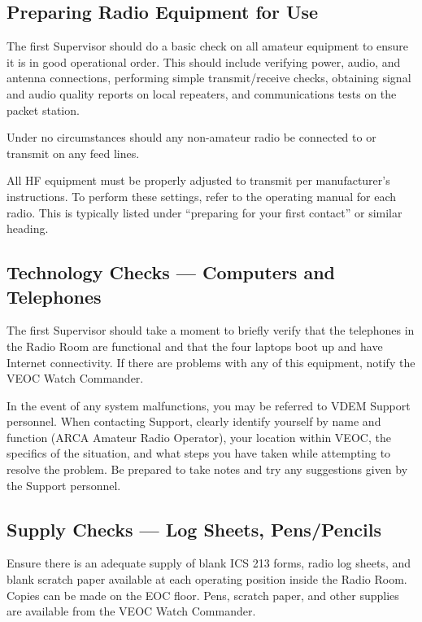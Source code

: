 \documentclass[pdflatex,letterpaper,twoside,12pt]{book}
\begin{document}
\subsection{Preparing Radio Equipment for Use}

The first Supervisor should do a basic check on all amateur equipment to ensure it is in good operational order.  This should include verifying power, audio, and antenna connections, performing simple transmit/receive checks, obtaining signal and audio quality reports on local repeaters, and communications tests on the packet station.

Under no circumstances should any non-amateur radio be connected to or transmit on any feed lines.

All HF equipment must be properly adjusted to transmit per manufacturer's instructions.  To perform these settings, refer to the operating manual for each radio.  This is typically listed under ``preparing for your first contact'' or similar heading.

\subsection{Technology Checks --- Computers and Telephones}

The first Supervisor should take a moment to briefly verify that the telephones in the Radio Room are functional and that the four laptops boot up and have Internet connectivity.  If there are problems with any of this equipment, notify the VEOC Watch Commander.

In the event of any system malfunctions, you may be referred to VDEM Support personnel.  When contacting Support, clearly identify yourself by name and function (ARCA Amateur Radio Operator), your location within VEOC, the specifics of the situation, and what steps you have taken while attempting to resolve the problem.  Be prepared to take notes and try any suggestions given by the Support personnel.

\subsection{Supply Checks --- Log Sheets, Pens/Pencils}

Ensure there is an adequate supply of blank ICS 213 forms, radio log sheets, and blank scratch paper available at each operating position inside the Radio Room.  Copies can be made on the EOC floor.  Pens, scratch paper, and other supplies are available from the VEOC Watch Commander.
\end{document}
